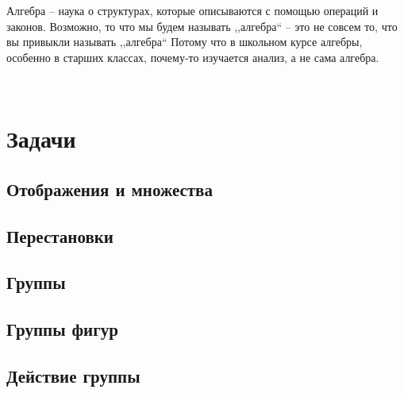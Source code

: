 \documentclass[10pt, twoside]{article}
\begin{document}
\pagestyle{empty}



\newpage

\tableofcontents
\newpage

\setcounter{page}{1}
\pagestyle{fancy}

Алгебра -- наука о структурах, которые описываются с помощью операций и законов. 
Возможно, то что мы будем называть ,,алгебра`` -- это не совсем то, что вы привыкли называть ,,алгебра`` 
Потому что в школьном курсе алгебры, особенно в старших классах, почему-то изучается анализ, а не сама алгебра.


\setcounter{section}{-1}







\clearpage
\
\thispagestyle{empty}
\setcounter{subsection}{-1}
\renewcommand{\thesubsection}{\arabic{subsection}}

\section*{Задачи}


\subsection{Отображения и множества}

\subsection{Перестановки}

\subsection{Группы}

\subsection{Группы фигур}
 
\subsection{Действие группы}

\end{document}
